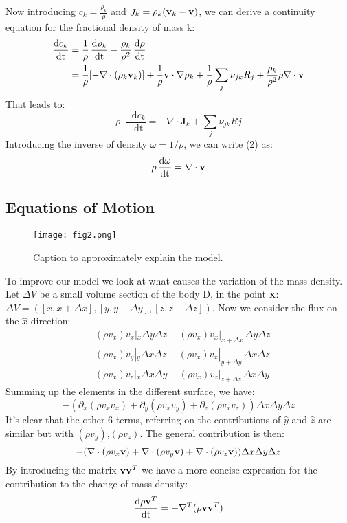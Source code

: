 \documentclass{article}
\newcommand*\diff{\mathop{}\!\mathrm{d}}
\newcommand*\Tder[1]{\mathop{}\!\frac{\diff #1}{\diff \mathrm{t}}}
\begin{document}
Now introducing $c_k = \frac{\rho_k}{\rho}$ and $\mathop{J}_k = \rho_k (\v_v_k -\v_v)$, we can derive a continuity equation for the fractional density of mass k:
\begin{equation*}
    \begin{aligned}
    \Tder {c_k} &= \frac{1}{\rho} \Tder {\rho_k} -\frac{\rho_k}{\rho^2}\Tder \rho \\
    &= \frac{1}{\rho}[-\nabla \cdot (\rho_k \v_v_k)]+\frac{1}{\rho} \v_v \cdot \nabla \rho_k +\frac{1}{\rho}\sum_j \nu_{jk}R_j +\frac{\rho_k}{\rho^2}\rho \nabla \cdot \v_v
    \end{aligned}
\end{equation*}
That leads to:
$$\rho \Tder{c_k} = -\nabla \cdot \mathbf{J}_k + \sum_j \nu_{jk}Rj $$
Introducing the inverse of density $\omega = 1/\rho$, we can write (2) as: 
$$\rho \Tder{\omega} = \nabla \cdot \v_v$$




\subsection{Equations of Motion}

\begin{figure*}[b]
    \centering
    \texttt{[image: fig2.png]}
    \caption{Caption to approximately explain the model.}
    \label{fig:my_label}
\end{figure*}


To improve our model we look at what causes the variation of the mass density. Let $\Delta V$ be a small volume section of the body D, in the point $\x_v$: $\Delta V = ([x,x+\Delta x],[y,y+\Delta y],[z,z+\Delta z])$. Now we consider the flux on the $\hat{x}$ direction:
\begin{equation*}
    \begin{aligned}
    & (\rho v_x)v_x  |_x \Delta y  \Delta z - (\rho v_x)v_x|_{x+\Delta x} \, \Delta y  \Delta z \\ 
    & (\rho v_x)v_y  |_y \Delta x  \Delta z - (\rho v_x)v_x|_{y+\Delta y} \, \Delta x  \Delta z \\
    & (\rho v_x)v_z  |_x \Delta x  \Delta y - (\rho v_x)v_z|_{z+\Delta z} \, \Delta x  \Delta y 
    \end{aligned}
\end{equation*}
Summing up the elements in the different surface, we have:
$$-(\partial_x (\rho v_x v_x) + \partial_y (\rho v_x v_y) +\partial_z (\rho v_x v_z))\Delta x\Delta y\Delta z $$
It's clear that the other 6 terms, referring on the contributions of $\hat{y}$ and $\hat{z}$ are similar but with $(\rho v_y)$,$(\rho v_z)$. The general contribution is then:
$$- (\nabla \cdot (\rho v_x \v_v)+ \nabla \cdot (\rho v_y \v_v)+\nabla \cdot (\rho v_z \v_v)) \Delta x\Delta y\Delta z $$
By introducing the matrix $\v_v \v_v^T$ we have a more concise expression for the contribution to the change of mass density:
\begin{equation}
  \Tder{\rho \v_v^T} = -\nabla^T (\rho \v_v\v_v^T)  
\end{equation}
\end{document}
